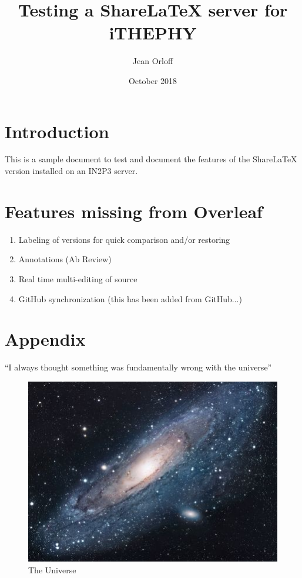 \documentclass{article}
\title{Testing a ShareLaTeX server for iTHEPHY}
\author{Jean Orloff}
\date{October 2018}
\begin{document}
\maketitle

\section{Introduction}
This is a sample document to test and document the features of the ShareLaTeX version installed on an IN2P3 server.

\section{Features missing from Overleaf}
\begin{enumerate}
    \item Labeling of versions for quick comparison and/or restoring  
    \item Annotations (Ab Review)
    \item Real time multi-editing of source
    \item GitHub synchronization (this has been added from GitHub...)
\end{enumerate}



\section{Appendix}
``I always thought something was fundamentally wrong with the universe'' \citep{adams1995hitchhiker}
\begin{figure}[h!]
\centering
\includegraphics[scale=1.7]{universe}
\caption{The Universe}
\label{fig:universe}
\end{figure}




\end{document}
